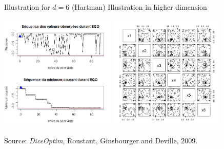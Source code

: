 \documentclass{beamer}
\begin{document}
\begin{frame}{}
\begin{exampleblock}{Illustration for $d=6$ (Hartman)}
	Illustration in higher dimension
\begin{center}
\includegraphics[height=5.5cm]{figures/egoHartman} \includegraphics[height=5.5cm]{figures/egoHartman2}
\end{center}
\small Source: \textit{DiceOptim}, Roustant, Ginsbourger and Deville, 2009.
\end{exampleblock}
\end{frame}
 
\end{document}
